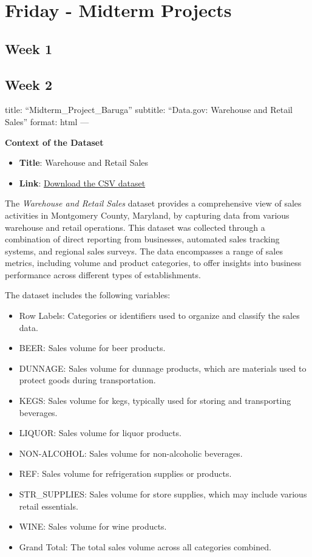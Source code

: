 \documentclass[
  letterpaper,
  DIV=11,
  numbers=noendperiod]{scrreprt}
\providecommand{\tightlist}{%
  \setlength{\itemsep}{0pt}\setlength{\parskip}{0pt}}\usepackage{longtable,booktabs,array}
\begin{document}
\section{Friday - Midterm Projects}\label{friday---midterm-projects-2}

\subsection{Week 1}\label{week-1-5}

\subsection{Week 2}\label{week-2-5}

title: ``Midterm\_Project\_Baruga'' subtitle: ``Data.gov: Warehouse and
Retail Sales'' format: html ---

\textbf{Context of the Dataset}

\begin{itemize}
\tightlist
\item
  \textbf{Title}: Warehouse and Retail Sales
\item
  \textbf{Link}:
  \href{https://data.montgomerycountymd.gov/api/views/v76h-r7br/rows.csv?accessType=DOWNLOAD}{Download
  the CSV dataset}
\end{itemize}

The \emph{Warehouse and Retail Sales} dataset provides a comprehensive
view of sales activities in Montgomery County, Maryland, by capturing
data from various warehouse and retail operations. This dataset was
collected through a combination of direct reporting from businesses,
automated sales tracking systems, and regional sales surveys. The data
encompasses a range of sales metrics, including volume and product
categories, to offer insights into business performance across different
types of establishments.

The dataset includes the following variables:

\begin{itemize}
\tightlist
\item
  Row Labels: Categories or identifiers used to organize and classify
  the sales data.
\item
  BEER: Sales volume for beer products.
\item
  DUNNAGE: Sales volume for dunnage products, which are materials used
  to protect goods during transportation.
\item
  KEGS: Sales volume for kegs, typically used for storing and
  transporting beverages.
\item
  LIQUOR: Sales volume for liquor products.
\item
  NON-ALCOHOL: Sales volume for non-alcoholic beverages.
\item
  REF: Sales volume for refrigeration supplies or products.
\item
  STR\_SUPPLIES: Sales volume for store supplies, which may include
  various retail essentials.
\item
  WINE: Sales volume for wine products.
\item
  Grand Total: The total sales volume across all categories combined.
\end{itemize}
\end{document}
